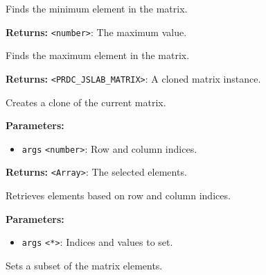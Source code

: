 \documentclass[12pt,a4paper]{article}
\begin{document}
\noindent Finds the minimum element in the matrix.

\vspace{5mm}
\noindent {}


\noindent \textbf{Returns:} \texttt{<number>}: The maximum value.

\noindent Finds the maximum element in the matrix.

\vspace{5mm}
\noindent {}


\noindent \textbf{Returns:} \texttt{<PRDC\_JSLAB\_MATRIX>}: A cloned matrix instance.

\noindent Creates a clone of the current matrix.

\vspace{5mm}
\noindent {}


\noindent \textbf{Parameters:}
\begin{itemize}
  \item \texttt{args} \texttt{<number>}: Row and column indices.
\end{itemize}

\noindent \textbf{Returns:} \texttt{<Array>}: The selected elements.

\noindent Retrieves elements based on row and column indices.

\vspace{5mm}
\noindent {}


\noindent \textbf{Parameters:}
\begin{itemize}
  \item \texttt{args} \texttt{<*>}: Indices and values to set.
\end{itemize}

\noindent Sets a subset of the matrix elements.

\vspace{5mm}
\noindent {}
\end{document}
